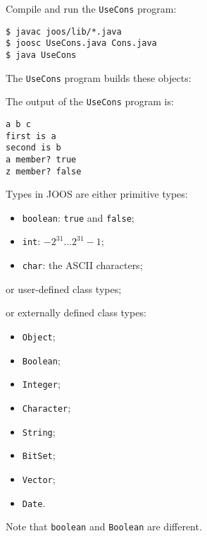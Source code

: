 \begin{slide*}
Compile and run the {\tt UseCons} program:
\begin{scriptsize}
\begin{verbatim}
$ javac joos/lib/*.java
$ joosc UseCons.java Cons.java
$ java UseCons
\end{verbatim}
\end{scriptsize}

The {\tt UseCons} program builds these objects:\\

\begin{center}
\end{center}

The output of the {\tt UseCons} program is:

\begin{scriptsize}
\begin{verbatim}
a b c
first is a
second is b
a member? true
z member? false
\end{verbatim}
\end{scriptsize}

\vfil
\end{slide*}

\begin{slide*}
Types in JOOS are either primitive types:
\begin{itemize}
\item {\tt boolean}: {\tt true} and {\tt false};
\item {\tt int}: $-2^{31} \ldots 2^{31}-1$;
\item {\tt char}: the ASCII characters;
\end{itemize}
or user-defined class types;

or externally defined class types:
\begin{itemize}
\item {\tt Object};
\item {\tt Boolean};
\item {\tt Integer};
\item {\tt Character};
\item {\tt String};
\item {\tt BitSet};
\item {\tt Vector}; 
\item {\tt Date}.
\end{itemize}

Note that {\tt boolean} and {\tt Boolean} are different.
\vfil
\end{slide*}

